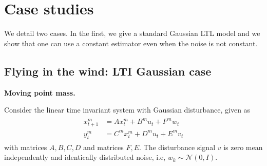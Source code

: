 \documentclass{ifacconf}
\begin{document}
%
%
%
%
%
%  
%
%
%





\section{Case studies}
 We detail two cases. In the first, we give a standard Gaussian LTL model and we show that one can use a constant estimator even when the noise is not constant.
 
\subsection{Flying in the wind: LTI Gaussian case}



\noindent\textbf{Moving point mass.}
    
Consider the linear time invariant system with Gaussian disturbance, given as 
\begin{align}\begin{aligned}
	x^m_{t+1} &= A x^m_{t}+B^mu_{t}+ F^m w_{t}\\
	y^m_{t}&=C^m x^m_{t}+D^m u_{t}+E^m v_{t}\end{aligned}
\end{align}
with matrices $A,B,C,D$ and matrices $F,E$. 
The disturbance signal $v$ is zero mean independently and identically  distributed noise, i.e, $w_k\sim \mathcal{N}(0,I)$.
\end{document}

